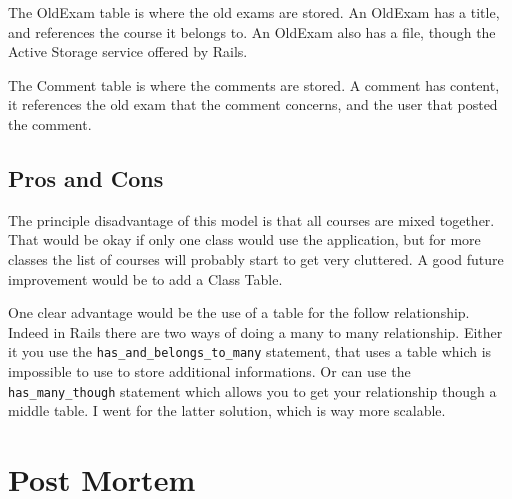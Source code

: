 \documentclass[12pt,a4paper]{article}
\begin{document}
The OldExam table is where the old exams are stored. An OldExam has a title,
and references the course it belongs to. An OldExam also has a file, though the
Active Storage service offered by Rails.

The Comment table is where the comments are stored. A comment has content, it
references the old exam that the comment concerns, and the user that posted the
comment.

\subsection{Pros and Cons}


The principle disadvantage of this model is that all courses are mixed
together. That would be okay if only one class would use the application, but
for more classes the list of courses will probably start to get very cluttered.
A good future improvement would be to add a Class Table.

One clear advantage would be the use of a table for the follow relationship.
Indeed in Rails there are two ways of doing a many to many relationship. Either
it you use the \lstinline{has_and_belongs_to_many} statement, that uses a table
which is impossible to use to store additional informations. Or can use the
\lstinline{has_many_though} statement which allows you to get your relationship
though a middle table. I went for the latter solution, which is way more
scalable.


\section{Post Mortem}

\end{document}
